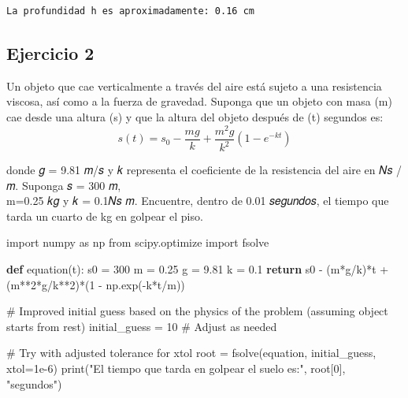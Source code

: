 \documentclass[
  letterpaper,
  DIV=11,
  numbers=noendperiod]{scrartcl}
\newenvironment{Shaded}{\begin{snugshade}}{\end{snugshade}}
\newcommand{\BuiltInTok}[1]{\textcolor[rgb]{0.00,0.23,0.31}{#1}}
\newcommand{\CommentTok}[1]{\textcolor[rgb]{0.37,0.37,0.37}{#1}}
\newcommand{\ControlFlowTok}[1]{\textcolor[rgb]{0.00,0.23,0.31}{\textbf{#1}}}
\newcommand{\DecValTok}[1]{\textcolor[rgb]{0.68,0.00,0.00}{#1}}
\newcommand{\FloatTok}[1]{\textcolor[rgb]{0.68,0.00,0.00}{#1}}
\newcommand{\ImportTok}[1]{\textcolor[rgb]{0.00,0.46,0.62}{#1}}
\newcommand{\KeywordTok}[1]{\textcolor[rgb]{0.00,0.23,0.31}{\textbf{#1}}}
\newcommand{\NormalTok}[1]{\textcolor[rgb]{0.00,0.23,0.31}{#1}}
\newcommand{\OperatorTok}[1]{\textcolor[rgb]{0.37,0.37,0.37}{#1}}
\newcommand{\StringTok}[1]{\textcolor[rgb]{0.13,0.47,0.30}{#1}}
\begin{document}
\begin{verbatim}
La profundidad h es aproximadamente: 0.16 cm
\end{verbatim}

\subsection{Ejercicio 2}\label{ejercicio-2}

Un objeto que cae verticalmente a través del aire está sujeto a una
resistencia viscosa, así como a la fuerza de gravedad. Suponga que un
objeto con masa (m) cae desde una altura (s) y que la altura del objeto
después de (t) segundos es:\\
\[
s(t) = s_0 - \frac{mg}{k} + \frac{m^2g}{k^2}\left( 1 - e^{-kt} \right)
\]

donde 𝑔 = 9.81 𝑚/𝑠 y 𝑘 representa el coeficiente de la resistencia del
aire en 𝑁𝑠 /𝑚. Suponga 𝑠 = 300 𝑚,\\
m=0.25 𝑘𝑔 y 𝑘 = 0.1𝑁𝑠 𝑚. Encuentre, dentro de 0.01 𝑠𝑒𝑔𝑢𝑛𝑑𝑜𝑠, el tiempo
que tarda un cuarto de kg en golpear el piso.

\begin{Shaded}
\begin{Highlighting}[]
\ImportTok{import}\NormalTok{ numpy }\ImportTok{as}\NormalTok{ np}
\ImportTok{from}\NormalTok{ scipy.optimize }\ImportTok{import}\NormalTok{ fsolve}

\KeywordTok{def}\NormalTok{ equation(t):}
\NormalTok{  s0 }\OperatorTok{=} \DecValTok{300}
\NormalTok{  m }\OperatorTok{=} \FloatTok{0.25}
\NormalTok{  g }\OperatorTok{=} \FloatTok{9.81}
\NormalTok{  k }\OperatorTok{=} \FloatTok{0.1}
  \ControlFlowTok{return}\NormalTok{ s0 }\OperatorTok{{-}}\NormalTok{ (m}\OperatorTok{*}\NormalTok{g}\OperatorTok{/}\NormalTok{k)}\OperatorTok{*}\NormalTok{t }\OperatorTok{+}\NormalTok{ (m}\OperatorTok{**}\DecValTok{2}\OperatorTok{*}\NormalTok{g}\OperatorTok{/}\NormalTok{k}\OperatorTok{**}\DecValTok{2}\NormalTok{)}\OperatorTok{*}\NormalTok{(}\DecValTok{1} \OperatorTok{{-}}\NormalTok{ np.exp(}\OperatorTok{{-}}\NormalTok{k}\OperatorTok{*}\NormalTok{t}\OperatorTok{/}\NormalTok{m))}

\CommentTok{\# Improved initial guess based on the physics of the problem (assuming object starts from rest)}
\NormalTok{initial\_guess }\OperatorTok{=} \DecValTok{10}  \CommentTok{\# Adjust as needed}

\CommentTok{\# Try with adjusted tolerance for xtol}
\NormalTok{root }\OperatorTok{=}\NormalTok{ fsolve(equation, initial\_guess, xtol}\OperatorTok{=}\FloatTok{1e{-}6}\NormalTok{)}
\BuiltInTok{print}\NormalTok{(}\StringTok{"El tiempo que tarda en golpear el suelo es:"}\NormalTok{, root[}\DecValTok{0}\NormalTok{], }\StringTok{"segundos"}\NormalTok{)}
\end{Highlighting}
\end{Shaded}
\end{document}
